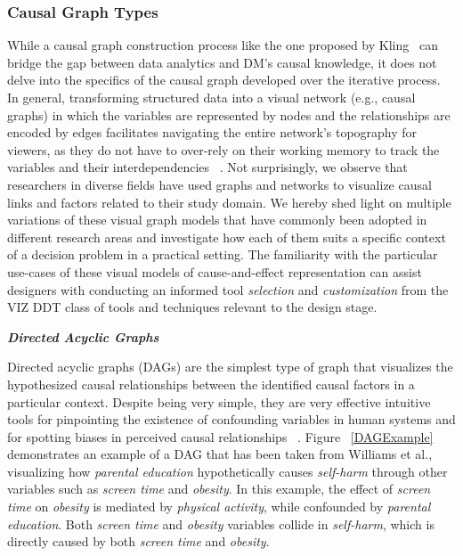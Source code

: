 \documentclass{sfuthesis}
\begin{document}
\subsubsection{Causal Graph Types}
While a causal graph construction process like the one proposed by Kling~\cite{kling2025co} can bridge the gap between data analytics and DM's causal knowledge, it does not delve into the specifics of the causal graph developed over the iterative process. In general, transforming structured data into a visual network (e.g., causal graphs) in which the variables are represented by nodes and the relationships are encoded by edges facilitates navigating the entire network's topography for viewers, as they do not have to over-rely on their working memory to track the variables and their interdependencies ~\cite{munzner_visualization_2015}.
Not surprisingly, we observe that researchers in diverse fields have used graphs and networks to visualize causal links and factors related to their study domain. We hereby shed light on multiple variations of these visual graph models that have commonly been adopted in different research areas and investigate how each of them suits a specific context of a decision problem in a practical setting. The familiarity with the particular use-cases of these visual models of cause-and-effect representation can assist designers with conducting an informed tool \textit{selection} and \textit{customization} from the VIZ DDT class of tools and techniques relevant to the design stage.\par
\noindent \textit{\textbf{Directed Acyclic Graphs}}\par
Directed acyclic graphs (DAGs) are the simplest type of graph that visualizes the hypothesized causal relationships between the identified causal factors in a particular context. Despite being very simple, they are very effective intuitive tools for pinpointing the existence of confounding variables in human systems and for spotting biases in perceived causal relationships ~\cite{shrier_reducing_2008,williams_directed_2018,digitale_tutorial_2022}. Figure ~\ref{DAGExample} demonstrates an example of a DAG that has been taken from Williams et al.\cite{williams_directed_2018}, visualizing how \textit{parental education} hypothetically causes \textit{self-harm} through other variables such as \textit{screen time} and \textit{obesity}. In this example, the effect of \textit{screen time} on \textit{obesity} is mediated by \textit{physical activity}, while confounded by \textit{parental education}. Both \textit{screen time} and \textit{obesity} variables collide in \textit{self-harm}, which is directly caused by both \textit{screen time} and \textit{obesity}.\par 
\end{document}
